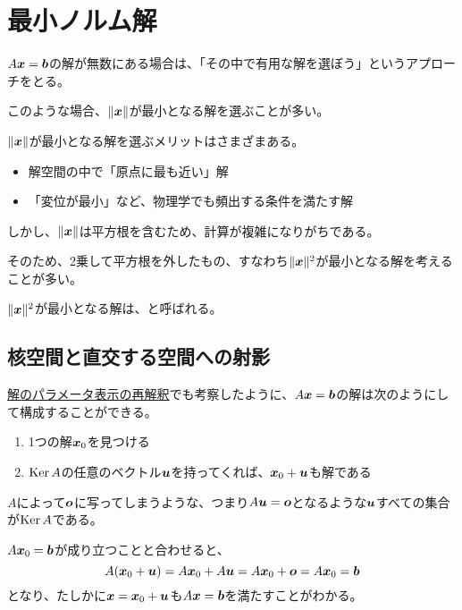 \documentclass[../../../topic_linear-algebra]{subfiles}
\begin{document}
\sectionline
\section{最小ノルム解}

$A\vb*{x} = \vb*{b}$の解が無数にある場合は、「その中で有用な解を選ぼう」というアプローチをとる。

このような場合、$\| \vb*{x} \|$が最小となる解を選ぶことが多い。

\br

$\| \vb*{x} \|$が最小となる解を選ぶメリットはさまざまある。
\begin{itemize}
  \item 解空間の中で「原点に最も近い」解
  \item 「変位が最小」など、物理学でも頻出する条件を満たす解
\end{itemize}

しかし、$\| \vb*{x} \|$は平方根を含むため、計算が複雑になりがちである。

\br

そのため、2乗して平方根を外したもの、すなわち$\| \vb*{x} \|^2$が最小となる解を考えることが多い。

$\| \vb*{x} \|^2$が最小となる解は、と呼ばれる。

\subsection{核空間と直交する空間への射影}

\hyperref[sec:reinterpretation-of-parametric-solution]{解のパラメータ表示の再解釈}でも考察したように、$A\vb*{x} = \vb*{b}$の解は次のようにして構成することができる。

\begin{enumerate}
  \item 1つの解$\vb*{x}_0$を見つける
  \item $\operatorname{Ker} A$の任意のベクトル$\vb*{u}$を持ってくれば、$\vb*{x}_0 + \vb*{u}$も解である
\end{enumerate}

\br

\begin{handout}
  $A$によって$\vb*{o}$に写ってしまうような、つまり$A\vb*{u}=\vb*{o}$となるような$\vb*{u}$すべての集合が$\operatorname{Ker} A$である。
  
  \br
  
  $A\vb*{x}_0 = \vb*{b}$が成り立つことと合わせると、
  \begin{equation*}
    A(\vb*{x}_0 + \vb*{u}) = A\vb*{x}_0 + A\vb*{u} = A\vb*{x}_0 + \vb*{o} = A\vb*{x}_0 = \vb*{b}
  \end{equation*}
  となり、たしかに$\vb*{x} = \vb*{x}_0 + \vb*{u}$も$A\vb*{x} = \vb*{b}$を満たすことがわかる。
\end{handout}
\end{document}
